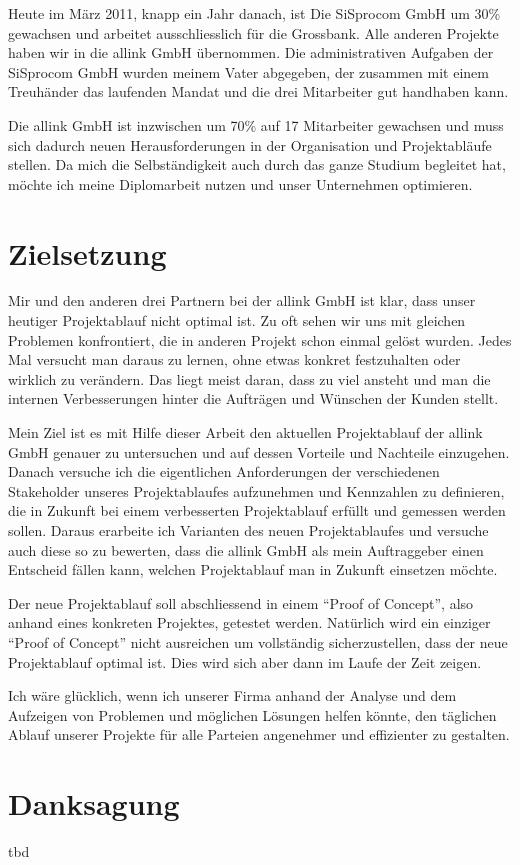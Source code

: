 Heute im März 2011, knapp ein Jahr danach, ist Die SiSprocom GmbH um 30\% 
gewachsen und arbeitet ausschliesslich für die Grossbank. Alle anderen Projekte
haben wir in die allink GmbH übernommen. Die administrativen Aufgaben der
SiSprocom GmbH wurden
meinem Vater abgegeben, der zusammen mit einem Treuhänder das laufenden
Mandat und die drei Mitarbeiter gut handhaben kann.

Die allink GmbH ist inzwischen um 70\% auf 17 Mitarbeiter gewachsen und muss sich dadurch
neuen Herausforderungen in der Organisation und Projektabläufe stellen. Da
mich die Selbständigkeit auch durch das ganze Studium begleitet hat, möchte 
ich meine Diplomarbeit nutzen und unser Unternehmen optimieren.

\section{Zielsetzung}
Mir und den anderen drei Partnern bei der allink GmbH ist klar, dass unser
heutiger Projektablauf nicht optimal ist. Zu oft sehen wir uns mit gleichen
Problemen konfrontiert, die in anderen Projekt schon einmal gelöst wurden.
Jedes Mal versucht man daraus zu lernen, ohne etwas konkret festzuhalten oder
wirklich zu verändern. Das liegt meist daran, dass zu viel ansteht und man
die internen Verbesserungen hinter die Aufträgen und Wünschen der Kunden
stellt.

Mein Ziel ist es mit Hilfe dieser Arbeit den aktuellen Projektablauf der
allink GmbH genauer zu untersuchen und auf dessen Vorteile und Nachteile einzugehen.
Danach versuche ich die eigentlichen Anforderungen der verschiedenen Stakeholder
unseres Projektablaufes aufzunehmen und Kennzahlen zu definieren, die in Zukunft
bei einem verbesserten Projektablauf erfüllt und gemessen werden sollen.
Daraus erarbeite ich Varianten des neuen Projektablaufes und versuche auch
diese so zu bewerten, dass die allink GmbH als mein Auftraggeber einen
Entscheid fällen kann, welchen Projektablauf man in Zukunft einsetzen möchte.

Der neue Projektablauf soll abschliessend in einem ``Proof of Concept'', also
anhand eines konkreten Projektes, getestet werden. Natürlich wird ein einziger
``Proof of Concept'' nicht ausreichen um vollständig sicherzustellen, dass der
neue Projektablauf optimal ist. Dies wird sich aber dann im Laufe der Zeit zeigen.

Ich wäre glücklich, wenn ich unserer Firma anhand der Analyse und
dem Aufzeigen von Problemen und möglichen Lösungen helfen könnte, den täglichen
Ablauf unserer Projekte für alle Parteien angenehmer und effizienter zu gestalten.

\section{Danksagung}
tbd
